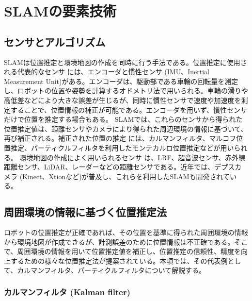 \section{SLAMの要素技術}

\subsection{センサとアルゴリズム}

SLAMは位置推定と環境地図の作成を同時に行う手法である。位置推定に使用される代表的なセンサ  には、エンコーダと慣性センサ (IMU、Inertial Measurement Unit)がある。エンコーダは、駆動部である車輪の回転量を測定し、ロボットの位置や姿勢を計算するオドメトリ法で用いられる。車輪の滑りや高低差などにより大きな誤差が生じるが、同時に慣性センサで速度や加速度を測定することで、位置情報の補正が可能である。エンコーダを用いず、慣性センサだけで位置を推定する場合もある。
SLAMでは、これらのセンサから得られた位置推定値は、距離センサやカメラにより得られた周辺環境の情報に基づいて、再び補正される。補正された位置の推定  には、カルマンフィルタ、マルコフ位置推定、パーティクルフィルタを利用したモンテカルロ位置推定などが用いられる。
環境地図の作成によく用いられるセンサ  は、LRF、超音波センサ、赤外線距離センサ、LiDAR、レーダーなどの距離センサである。近年では、デプスカメラ (Kinect、Xtionなど)が普及し、これらを利用したSLAMも開発されている。

\subsection{周囲環境の情報に基づく位置推定法}

ロボットの位置推定が正確であれば、その位置を基準に得られた周囲環境の情報から環境地図が作成できるが、計測誤差のために位置情報は不正確である。そこで、周囲環境の情報を用いて位置推定値を補正し、位置推定の信頼性、精度を向上するための様々な位置推定法が提案されている。本項では、その代表例として、カルマンフィルタ、パーティクルフィルタについて解説する。

\subsubsection{カルマンフィルタ (Kalman filter)}

